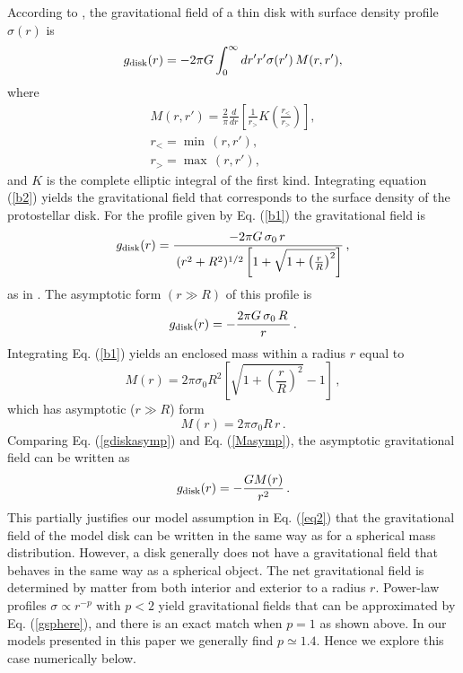 \documentclass[twocolumn,linenumbers]{aastex631}
\begin{document}
 According to \citet{toomre1963}, the gravitational field of a thin disk with surface density profile $\sigma(r)$ is
\begin{equation}
g_{\rm disk}(r) = -2\pi G \int_0^\infty dr'r'\sigma(r')\,M(r,r'),
\label{b2}
\end{equation}
where
\begin{align}
M(r, r') = \frac{2}{\pi} \frac{d}{dr}\left[\frac{1}{r_>} K\left(\frac{r_<}{r_>}\right) \right],\nonumber\\
r_< = \min \, (r, r'), \nonumber\\
r_> = \max \,(r,r'),\nonumber
\label{b3}
\end{align}
and $K$ is the complete elliptic integral of the first kind. Integrating equation (\ref{b2}) yields the gravitational field that corresponds to the surface density of the protostellar disk. For the profile given by Eq. (\ref{b1}) the gravitational field is \\
\begin{equation}
g_{\rm disk}(r) = \frac{-2 \pi G \, \sigma_0 \, r \,} {\, (r^2 + R^2)^{1/2} \left[ 1 + \sqrt{1 + \left( \frac{r}{R} \right)^2}\right]}\, ,
\end{equation}
as in \cite{basu1997}. The asymptotic form $(r \gg R)$ of this profile is 
\begin{equation}
   g_{\rm disk}(r) = -  \frac{2 \pi G \, \sigma_0 \, R \,}{r} \, .
   \label{gdiskasymp}
\end{equation}
Integrating Eq. (\ref{b1}) yields an enclosed mass within a radius $r$ equal to 
\begin{equation}
    M(r) = 2 \pi \sigma_0 R^2 \left[ \sqrt{1 + \left( \frac{r}{R} \right)^2} - 1\right] \, ,
\end{equation}
which has asymptotic ($r \gg R$) form
\begin{equation}
    M(r) =  2 \pi \sigma_0 R \, r \, .
    \label{Masymp}
\end{equation}
Comparing Eq. (\ref{gdiskasymp}) and Eq. (\ref{Masymp}), the asymptotic gravitational field can be written as 
\begin{equation}
    g_{\rm disk}(r) = - \frac{GM(r)}{r^2} \, .
    \label{gsphere}
\end{equation}
This partially justifies our model assumption in Eq. (\ref{eq2}) that the gravitational field of the model disk can be written in the same way as for a spherical mass distribution. However, a disk generally does not have a gravitational field that behaves in the same way as a spherical object. The net gravitational field is determined by matter from both interior and exterior to a radius $r$. Power-law profiles $\sigma \propto r^{-p}$ with $p<2$ yield gravitational fields that can be approximated by Eq. (\ref{gsphere}), and there is an exact match when $p=1$ as shown above. In our models presented in this paper we generally find $p \simeq 1.4$. Hence we explore this case numerically below.
\end{document}
